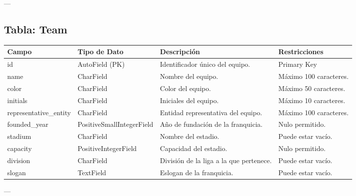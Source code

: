 \documentclass{report}
\begin{document}
    ---
    
    \subsection*{Tabla: Team}
    \begin{tabular}{|>{\raggedright\arraybackslash}p{3cm}|>{\raggedright\arraybackslash}p{3cm}|>{\raggedright\arraybackslash}p{6cm}|>{\raggedright\arraybackslash}p{4cm}|}
        \hline
        \textbf{Campo} & \textbf{Tipo de Dato} & \textbf{Descripción} & \textbf{Restricciones} \\
        \hline
        id & AutoField (PK) & Identificador único del equipo. & Primary Key \\
        \hline
        name & CharField & Nombre del equipo. & Máximo 100 caracteres. \\
        \hline
        color & CharField & Color del equipo. & Máximo 50 caracteres. \\
        \hline
        initials & CharField & Iniciales del equipo. & Máximo 10 caracteres. \\
        \hline
        representative\_entity & CharField & Entidad representativa del equipo. & Máximo 100 caracteres. \\
        \hline
        founded\_year & PositiveSmallIntegerField & Año de fundación de la franquicia. & Nulo permitido. \\
        \hline
        stadium & CharField & Nombre del estadio. & Puede estar vacío. \\
        \hline
        capacity & PositiveIntegerField & Capacidad del estadio. & Nulo permitido. \\
        \hline
        division & CharField & División de la liga a la que pertenece. & Puede estar vacío. \\
        \hline
        slogan & TextField & Eslogan de la franquicia. & Puede estar vacío. \\
        \hline
    \end{tabular}
    
    ---
    
\end{document}
